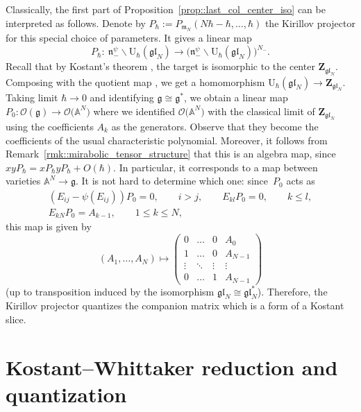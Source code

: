 \documentclass[pdftex]{sigma}
\numberwithin{equation}{section}
\newcommand{\cO}{\mathcal{O}}
\newcommand{\U}{\mathrm{U}_{\hbar}}
\newcommand{\Z}{\mathbf{Z}}
\newcommand{\g}{\mathfrak{g}}
\newcommand{\n}{\mathfrak{n}}
\newcommand{\m}{\mathfrak{m}}
\newcommand{\gl}{\mathfrak{gl}}
\begin{document}
	\begin{Remark}
		\label{rmk::special_param}
		Classically, the first part of Proposition~\ref{prop::last_col_center_iso} can be interpreted as follows. Denote by
		$
		P_{\hbar} := P_{\m_N}(N\hbar-\hbar,\dots,\hbar)
		$
		the Kirillov projector for this special choice of parameters. It gives a linear map
		\[
		P_{\hbar} \colon\ \n_-^{\psi} \backslash \U(\gl_N) \rightarrow \bigl(\n_-^{\psi} \backslash \U(\gl_N)\bigr)^{N_-}.
		\]
		Recall that by Kostant's theorem \cite{Kostant}, the target is isomorphic to the center $\Z_{\gl_N}$. Composing with the quotient map \smash{$\U(\gl_N) \rightarrow \n_-^{\psi} \backslash \U(\gl_N)$}, we get a homomorphism
		$
		\U(\gl_N) \rightarrow \Z_{\gl_N}$.
		Taking limit $\hbar \rightarrow 0$ and identifying $\g \cong \g^*$, we obtain a linear map
$
		P_0\colon \cO(\g) \rightarrow \cO\bigl(\mathbb{A}^N\bigr)$
		where we identified $\cO\bigl(\mathbb{A}^N\bigr)$ with the classical limit of $\Z_{\gl_N}$ using the coefficients $A_k$ as the generators. Observe that they become the coefficients of the usual characteristic polynomial. Moreover, it follows from Remark~\ref{rmk::mirabolic_tensor_structure} that this is an algebra map, since
$
		xy P_{\hbar}= x P_{\hbar} y P_{\hbar} + O(\hbar)$.
		In particular, it corresponds to a map between varieties $\mathbb{A}^N \rightarrow \g$. It is not hard to determine which one: since~$P_0$ acts as
		\begin{gather*}
			(E_{ij} - \psi(E_{ij})) P_{0} =0,\qquad i>j, \qquad
			E_{kl} P_0 = 0,\qquad k \leq l, \\
			E_{kN} P_0 = A_{k-1},\qquad 1 \leq k \leq N,
		\end{gather*}
		this map is given by
		\[
		(A_1,\dots,A_N) \mapsto
		\begin{pmatrix}
			0 & \dots & 0 & A_0 \\
			1 & \dots & 0 & A_{N-1} \\
			\vdots & \ddots & \vdots & \vdots \\
			0 & \dots & 1 & A_{N-1}
		\end{pmatrix}
		\]
		(up to transposition induced by the isomorphism $\gl_N \cong \gl_N^*$). Therefore, the Kirillov projector quantizes the companion matrix which is a form of a Kostant slice.
	\end{Remark}
	
	\section{Kostant--Whittaker reduction and quantization}
	\label{sect::kw_red}
	
\end{document}
